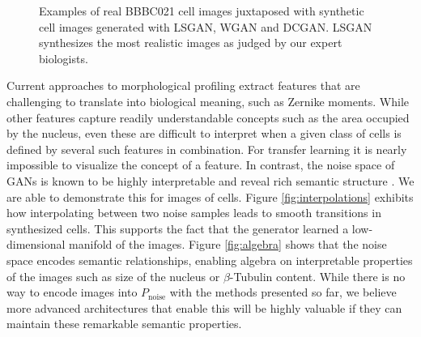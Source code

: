 \documentclass{article}
\begin{document}
\begin{figure}
  \centering
  \caption{Examples of real BBBC021 cell images juxtaposed with synthetic cell images generated with LSGAN, WGAN and DCGAN. LSGAN synthesizes the most realistic images as judged by our expert biologists.}
  \label{fig:generated}
\end{figure}

Current approaches to morphological profiling extract features that are
challenging to translate into biological meaning, such as Zernike moments. While
other features capture readily understandable concepts such as the area occupied
by the nucleus, even these are difficult to interpret when a given class of
cells is defined by several such features in combination. For transfer learning
it is nearly impossible to visualize the concept of a feature. In contrast, the
noise space of GANs is known to be highly interpretable and reveal rich
semantic structure \cite{radford2015unsupervised}. We are able to demonstrate
this for images of cells. Figure \ref{fig:interpolations} exhibits how
interpolating between two noise samples leads to smooth transitions in synthesized cells. This supports the fact that the generator learned a low-dimensional manifold of the images. Figure \ref{fig:algebra} shows
that the noise space encodes semantic relationships, enabling algebra on
interpretable properties of the images such as size of the nucleus or $\beta$-Tubulin content. While there is no way to encode images into $P_{\text{noise}}$ with the methods presented so far, we believe more advanced
architectures that enable this will be highly valuable if they can maintain these remarkable
semantic properties.
\end{document}
